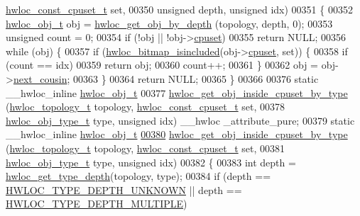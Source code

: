 \begin{DoxyCode}
{{      \hyperlink{a00040_ga1f784433e9b606261f62d1134f6a3b25}{hwloc_const_cpuset_t} \textcolor{keyword}{set},
00350                                       \textcolor{keywordtype}{unsigned} depth, \textcolor{keywordtype}{unsigned} idx)
00351 \{
00352   \hyperlink{a00016}{hwloc_obj_t} obj = \hyperlink{a00047_gaedd78240b0c1108355586a268ec5a697}{hwloc_get_obj_by_depth} (topology, depth, 0);
00353   \textcolor{keywordtype}{unsigned} count = 0;
00354   \textcolor{keywordflow}{if} (!obj || !obj->\hyperlink{a00016_a67925e0f2c47f50408fbdb9bddd0790f}{cpuset})
00355     \textcolor{keywordflow}{return} NULL;
00356   \textcolor{keywordflow}{while} (obj) \{
00357     \textcolor{keywordflow}{if} (\hyperlink{a00065_gaae29e14a926c198e8f91e6e4790621e7}{hwloc_bitmap_isincluded}(obj->\hyperlink{a00016_a67925e0f2c47f50408fbdb9bddd0790f}{cpuset}, \textcolor{keyword}{set})) \{
00358       \textcolor{keywordflow}{if} (count == idx)
00359         \textcolor{keywordflow}{return} obj;
00360       count++;
00361     \}
00362     obj = obj->\hyperlink{a00016_a85a788017457129589318b6c39451acf}{next_cousin};
00363   \}
00364   \textcolor{keywordflow}{return} NULL;
00365 \}
00366 
00376 \textcolor{keyword}{static} \_\_hwloc\_inline \hyperlink{a00016}{hwloc_obj_t}
00377 \hyperlink{a00054_gaa8dcdb85224f7350b90fb0a1ca91e6d6}{hwloc_get_obj_inside_cpuset_by_type} (\hyperlink{a00039_ga9d1e76ee15a7dee158b786c30b6a6e38}{hwloc_topology_t} topology, 
      \hyperlink{a00040_ga1f784433e9b606261f62d1134f6a3b25}{hwloc_const_cpuset_t} \textcolor{keyword}{set},
00378                                      \hyperlink{a00041_gacd37bb612667dc437d66bfb175a8dc55}{hwloc_obj_type_t} type, \textcolor{keywordtype}{unsigned} idx) \_\_hwloc
      \_attribute\_pure;
00379 \textcolor{keyword}{static} \_\_hwloc\_inline \hyperlink{a00016}{hwloc_obj_t}
\hypertarget{a00031_source_l00380}{}\hyperlink{a00054_gaa8dcdb85224f7350b90fb0a1ca91e6d6}{00380} \hyperlink{a00054_gaa8dcdb85224f7350b90fb0a1ca91e6d6}{hwloc_get_obj_inside_cpuset_by_type} (\hyperlink{a00039_ga9d1e76ee15a7dee158b786c30b6a6e38}{hwloc_topology_t} topology, 
      \hyperlink{a00040_ga1f784433e9b606261f62d1134f6a3b25}{hwloc_const_cpuset_t} \textcolor{keyword}{set},
00381                                      \hyperlink{a00041_gacd37bb612667dc437d66bfb175a8dc55}{hwloc_obj_type_t} type, \textcolor{keywordtype}{unsigned} idx)
00382 \{
00383   \textcolor{keywordtype}{int} depth = \hyperlink{a00046_gaea7c64dd59467f5201ba87712710b14d}{hwloc_get_type_depth}(topology, type);
00384   \textcolor{keywordflow}{if} (depth == \hyperlink{a00046_ggaf4e663cf42bbe20756b849c6293ef575a0565ab92ab72cb0cec91e23003294aad}{HWLOC_TYPE_DEPTH_UNKNOWN} || depth == \hyperlink{a00046_ggaf4e663cf42bbe20756b849c6293ef575ae99465995cacde6c210d5fc2e409798c}{HWLOC_TYPE_DEPTH_MULTIPLE})
}}
\end{DoxyCode}
